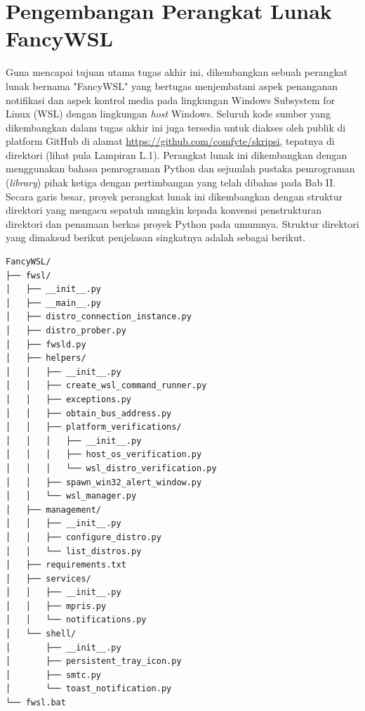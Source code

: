 \section{Pengembangan Perangkat Lunak FancyWSL}

Guna mencapai tujuan utama tugas akhir ini, dikembangkan sebuah perangkat lunak bernama "FancyWSL" yang bertugas menjembatani aspek penanganan notifikasi dan aspek kontrol media pada lingkungan Windows Subsystem for Linux (WSL) dengan lingkungan \textit{host} Windows. Seluruh kode sumber yang dikembangkan dalam tugas akhir ini juga tersedia untuk diakses oleh publik di platform GitHub di alamat \href{https://github.com/comfyte/skripsi}{https://github.com/comfyte/skripsi}, tepatnya di direktori  (lihat pula Lampiran L.1). Perangkat lunak ini dikembangkan dengan menggunakan bahasa pemrograman Python dan sejumlah pustaka pemrograman (\textit{library}) pihak ketiga dengan pertimbangan yang telah dibahas pada Bab II. Secara garis besar, proyek perangkat lunak ini dikembangkan dengan struktur direktori yang mengacu sepatuh mungkin kepada konvensi penstrukturan direktori dan penamaan berkas proyek Python pada umumnya. Struktur direktori yang dimaksud berikut penjelasan singkatnya adalah sebagai berikut.

\begin{verbatim}
FancyWSL/
├── fwsl/
│   ├── __init__.py
│   ├── __main__.py
│   ├── distro_connection_instance.py
│   ├── distro_prober.py
│   ├── fwsld.py
│   ├── helpers/
│   │   ├── __init__.py
│   │   ├── create_wsl_command_runner.py
│   │   ├── exceptions.py
│   │   ├── obtain_bus_address.py
│   │   ├── platform_verifications/
│   │   │   ├── __init__.py
│   │   │   ├── host_os_verification.py
│   │   │   └── wsl_distro_verification.py
│   │   ├── spawn_win32_alert_window.py
│   │   └── wsl_manager.py
│   ├── management/
│   │   ├── __init__.py
│   │   ├── configure_distro.py
│   │   └── list_distros.py
│   ├── requirements.txt
│   ├── services/
│   │   ├── __init__.py
│   │   ├── mpris.py
│   │   └── notifications.py
│   └── shell/
│       ├── __init__.py
│       ├── persistent_tray_icon.py
│       ├── smtc.py
│       └── toast_notification.py
└── fwsl.bat
\end{verbatim}


